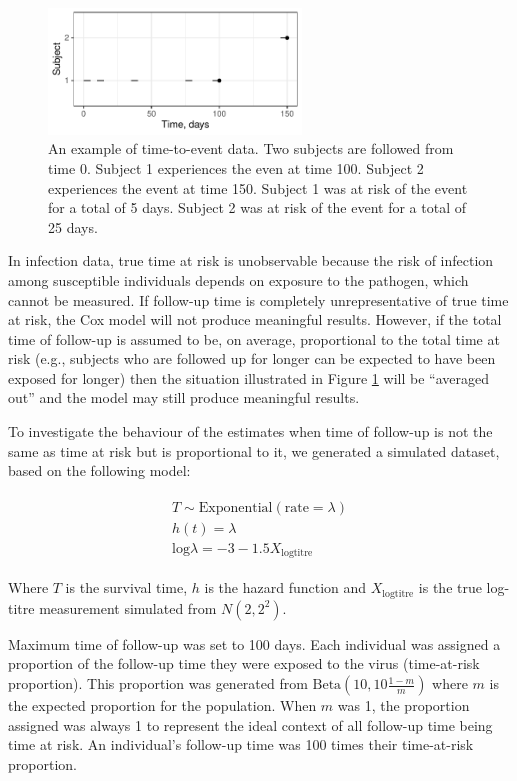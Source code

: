 \begin{figure}[htp]
	\centering
	\includegraphics[width=0.6\textwidth]{../curve-cox/timeplot_2_light.pdf}
	\caption{
	An example of time-to-event data. Two subjects are followed from time 0. Subject 1 experiences the even at time 100. Subject 2 experiences the event at time 150. Subject 1 was at risk of the event for a total of 5 days. Subject 2 was at risk of the event for a total of 25 days.
	}
	\label{CoxExamplePartial}
\end{figure}

In infection data, true time at risk is unobservable because the risk of infection among susceptible individuals depends on exposure to the pathogen, which cannot be measured. If follow-up time is completely unrepresentative of true time at risk, the Cox model will not produce meaningful results. However, if the total time of follow-up is assumed to be, on average, proportional to the total time at risk (e.g., subjects who are followed up for longer can be expected to have been exposed for longer) then the situation illustrated in Figure  \ref{CoxExamplePartial} will be ``averaged out'' and the model may still produce meaningful results.

To investigate the behaviour of the estimates when time of follow-up is not the same as time at risk but is proportional to it, we generated a simulated dataset, based on the following model:

\begin{align*}
\begin{gathered}
T \sim \text{Exponential}(\text{rate} = \lambda) \\
h(t) = \lambda \\
\text{log}\lambda = -3 - 1.5 X_{\text{logtitre}}
\end{gathered}
\end{align*}

Where $T$ is the survival time, $h$ is the hazard function and $X_{\text{logtitre}}$ is the true log-titre measurement simulated from $N(2, 2^2)$.

Maximum time of follow-up was set to 100 days. Each individual was assigned a proportion of the follow-up time they were exposed to the virus (time-at-risk proportion). This proportion was generated from $\text{Beta}(10, 10\frac{1-m}{m})$ where $m$ is the expected proportion for the population. When $m$ was 1, the proportion assigned was always 1 to represent the ideal context of all follow-up time being time at risk. An individual's follow-up time was 100 times their time-at-risk proportion.

